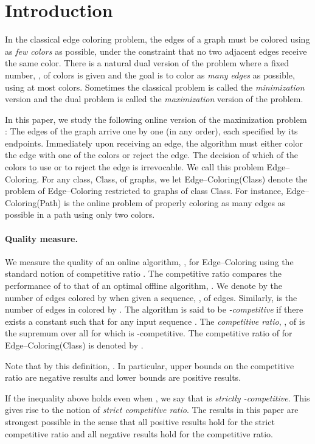 \documentclass[smallextended]{svjour3}
\def\mck{{\sc Edge--Coloring}\xspace}
\def\mcpath{{\sc Edge--Coloring(Path)}\xspace}
\def\mcclass{{\sc Edge--Coloring(Class)}\xspace}
\begin{document}
\section{Introduction}
In the classical edge coloring problem, the edges of a graph must be
 colored using as {\em few colors} as possible, under the constraint that no
 two adjacent edges receive the same color.
There is a natural dual version of the problem where a fixed number, , of
 colors is given and the goal is to color as {\em many edges} as possible,
 using at most  colors.
Sometimes the classical problem is called the {\em minimization} version and
 the dual problem is called the {\em maximization} version of the problem.

In this paper, we study the following online version of the maximization problem \cite{kedge}: The edges of the graph arrive one by one (in any order), each specified by its endpoints. Immediately upon receiving an edge, the algorithm must either color
 the edge with one of the  colors or reject the edge. 
The decision of which of the  colors to use or to reject the edge
 is irrevocable. 
We call this problem \mck. 
For any class, {\sc Class}, of graphs, we let \mcclass denote the problem
 of \mck restricted to graphs of class {\sc Class}.
For instance, \mcpath is the online problem of properly coloring as many edges
 as possible in a path using only two colors.

\paragraph{Quality measure.}
We measure the quality of an online algorithm, , for \mck using
the standard notion of competitive ratio \cite{CompRatio1,
  CompRatio2}. The competitive ratio compares the performance of
 to that of an optimal offline algorithm, . We denote by
 the number of edges colored by  when given a
sequence, , of edges. Similarly,  is the number
of edges in  colored by . The algorithm  is said
to be \emph{-competitive} if there exists a constant  such that
 for any input sequence
. The \emph{competitive ratio}, , of  is
the supremum over all  for which  is -competitive. 
The competitive ratio of  for \mcclass is denoted by
 .

Note that by this definition, . In particular, upper bounds on the competitive ratio are negative results and lower bounds are positive results.

If the inequality above holds even when , we say that  is \emph{strictly -competitive}. This gives rise to the notion of \emph{strict competitive ratio}. 
The results in this paper are strongest possible in the sense that all positive results hold for the strict competitive ratio and all negative results hold for the competitive ratio.
\end{document}
